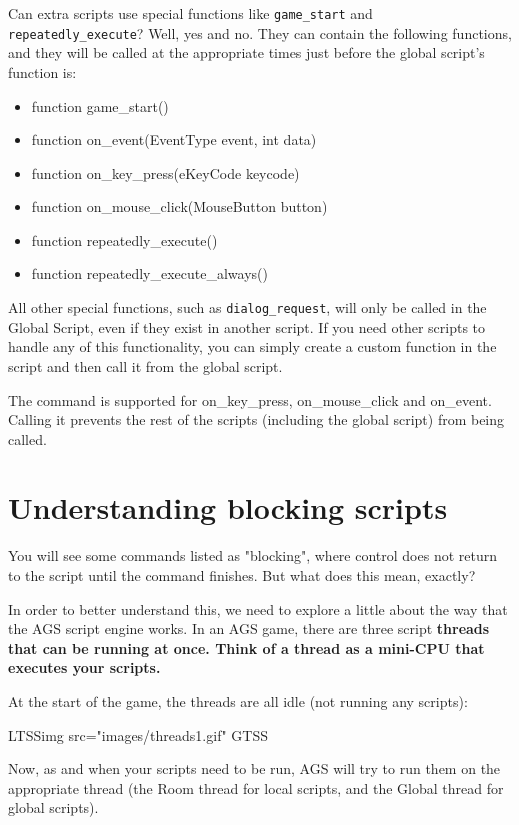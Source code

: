 Can extra scripts use special functions like \verb$game_start$ and \verb$repeatedly_execute$?
Well, yes and no. They can contain the following functions, and they will
be called at the appropriate times just before the global script's function is:
\begin{itemize}
\item function game_start()
\item function on_event(EventType event, int data)
\item function on_key_press(eKeyCode keycode)
\item function on_mouse_click(MouseButton button)
\item function repeatedly_execute()
\item function repeatedly_execute_always()
\end{itemize}
All other special functions, such as \verb$dialog_request$, will only be called in
the Global Script, even if they exist in another script. If you need other scripts to
handle any of this functionality, you can simply create a custom function in the
script and then call it from the global script.

The  command is supported for on_key_press, on_mouse_click
and on_event. Calling it prevents the rest of the scripts (including the global script) from being called.


\section{Understanding blocking scripts}\label{BlockingScripts}%

You will see some commands listed as "blocking", where control does not return
to the script until the command finishes. But what does this mean, exactly?

In order to better understand this, we need to explore a little about the way
that the AGS script engine works. In an AGS game, there are three script \bf{threads}
that can be running at once. Think of a thread as a mini-CPU that executes your scripts.

At the start of the game, the threads are all idle (not running any scripts):

LTSSimg src="images/threads1.gif" GTSS

Now, as and when your scripts need to be run, AGS will try to run them on the
appropriate thread (the Room thread for local scripts, and the Global thread
for global scripts).

